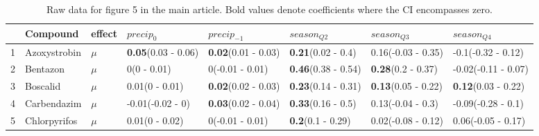 \begingroup\fontsize{8pt}{10pt}\selectfont
\begin{longtable}{lp{2cm}p{0.7cm}p{2cm}p{2cm}p{2cm}p{2cm}p{2cm}}
\caption{Raw data for figure 5 in the main article. 
                     Bold values denote coefficients where the CI encompasses zero.} \\ 
  \toprule
 & Compound & effect & $precip_0$ & $precip_{-1}$ & $season_{Q2}$ & $season_{Q3}$ & $season_{Q4}$ \\ 
  \midrule
1 & Azoxystrobin & $\mu$ & \textbf{0.05}\newline (0.03 - 0.06) & \textbf{0.02}\newline (0.01 - 0.03) & \textbf{0.21}\newline (0.02 - 0.4) & 0.16\newline (-0.03 - 0.35) & -0.1\newline (-0.32 - 0.12) \\ 
  2 & Bentazon & $\mu$ & 0\newline (0 - 0.01) & 0\newline (-0.01 - 0.01) & \textbf{0.46}\newline (0.38 - 0.54) & \textbf{0.28}\newline (0.2 - 0.37) & -0.02\newline (-0.11 - 0.07) \\ 
  3 & Boscalid & $\mu$ & 0.01\newline (0 - 0.01) & \textbf{0.02}\newline (0.02 - 0.03) & \textbf{0.23}\newline (0.14 - 0.31) & \textbf{0.13}\newline (0.05 - 0.22) & \textbf{0.12}\newline (0.03 - 0.22) \\ 
  4 & Carbendazim & $\mu$ & -0.01\newline (-0.02 - 0) & \textbf{0.03}\newline (0.02 - 0.04) & \textbf{0.33}\newline (0.16 - 0.5) & 0.13\newline (-0.04 - 0.3) & -0.09\newline (-0.28 - 0.1) \\ 
  5 & Chlorpyrifos & $\mu$ & 0.01\newline (0 - 0.02) & 0\newline (-0.01 - 0.01) & \textbf{0.2}\newline (0.1 - 0.29) & 0.02\newline (-0.08 - 0.12) & 0.06\newline (-0.05 - 0.17) \\ 

\end{longtable}
